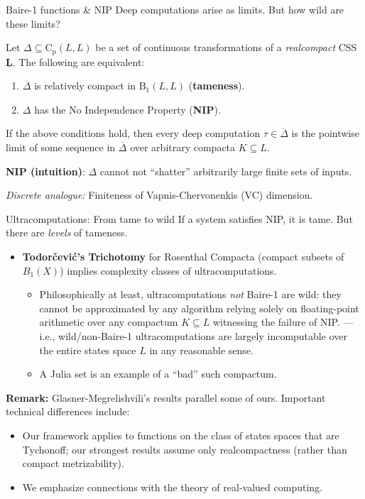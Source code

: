 \documentclass{beamer}
\newcommand{\Cp}{\mathrm{C}_{\mathrm{p}}}
\begin{document}
\begin{frame}{Baire-1 functions \& NIP}
  Deep computations arise as limits. But how wild are these limits?

  \begin{theorem}
    Let $\Delta\subseteq \Cp(L, L)$ be a set of continuous transformations of a \emph{realcompact} CSS~$\underline{\mathbf{L}}$.
    The following are equivalent:
    \begin{enumerate}
    \item $\overline{\Delta}$ is \alert{relatively compact} in $\mathrm{B}_1(L, L)$ (\alert{\textbf{tameness}}).
    \item $\Delta$ has the \alert{No Independence Property (\textbf{NIP})}.
    \end{enumerate}
    If the above conditions hold, then every deep computation $\tau\in \overline{\Delta}$ is the pointwise limit of some sequence in $\overline{\Delta}$ over arbitrary compacta $K\subseteq L$.
  \end{theorem}
    
  \footnotesize{\textbf{NIP (intuition)}: $\Delta$ cannot not “shatter” arbitrarily large finite sets of inputs.}

  \footnotesize{\emph{Discrete analogue:} Finiteness of \alert{Vapnis-Chervonenkis (VC) dimension}.}
\end{frame}

\begin{frame}{Ultracomputations: From tame to wild}
  If a system satisfies NIP, it is tame.
  But there are \alert{\emph{levels} of tameness}.
  \begin{itemize}
  \item \textbf{Todorčević’s Trichotomy} for Rosenthal Compacta (compact subsets of $B_1(X)$) implies \alert{complexity classes} of ultracomputations.
    \begin{itemize}
    \item Philosophically at least, ultracomputations \emph{not} Baire-1 are \alert{wild}:
    they cannot be approximated by any algorithm relying solely on floating-point arithmetic over any compactum $K\subseteq L$ witnessing the failure of NIP.
    —i.e., wild/non-Baire-1 ultracomputations are largely incomputable over the entire states space $L$ in any reasonable sense.
    \item A Julia set is an example of a “bad” such compactum.
    \end{itemize}
  \end{itemize}
  \alert{\textbf{Remark:}}
  Glasner-Megrelishvili’s results parallel some of ours.
  Important technical differences include:
  \begin{itemize}
  \item Our framework applies to functions on the class of states spaces that are Tychonoff;
    our strongest results assume only realcompactness (rather than compact metrizability).
  \item We emphasize connections with the theory of real-valued computing.
  \end{itemize}
\end{frame}
\end{document}
